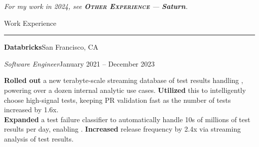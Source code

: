 












  \emph{For my work in 2024, see \textbf{\scshape{}Other Experience} --- \textbf{Saturn}.}

  \vspace{5pt}

  {\sectionfont Work Experience\vspace{2pt}\hrule}

  \vspace{5pt}
  \textbf{Databricks}\quad{}\hfill San Francisco, CA
  \begin{adjustwidth}{10pt}{}
    \emph{Software Engineer}\hfill January 2021 -- December 2023

    \textbf{Rolled out} a new terabyte-scale streaming database of test results handling , powering over a dozen internal analytic use cases.
    \textbf{Utilized} this to intelligently choose high-signal tests, keeping PR validation fast as the number of tests increased by 1.6x.\\
    \textbf{Expanded} a test failure classifier to automatically handle 10s of millions of test results per day, enabling .
    \textbf{Increased} release frequency by 2.4x via streaming analysis of test results.
  \end{adjustwidth}

